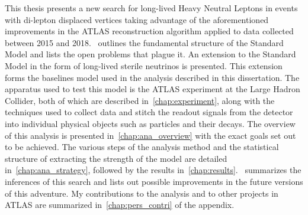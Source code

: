 This thesis presents a new search for long-lived Heavy Neutral Leptons in events with di-lepton displaced vertices taking advantage of the aforementioned improvements in the ATLAS reconstruction algorithm applied to data collected between 2015 and 2018.~ outlines the fundamental structure of the Standard Model and lists the open problems that plague it. An extension to the Standard Model in the form of long-lived sterile neutrinos is presented. This extension forms the baselines model used in the analysis described in this dissertation. The apparatus used to test this model is the ATLAS experiment at the Large Hadron Collider, both of which are described in~\cref{chap:experiment}, along with the techniques used to collect data and stitch the readout signals from the detector into individual physical objects such as particles and their decays. The overview of this analysis is presented in~\cref{chap:ana_overview} with the exact goals set out to be achieved. The various steps of the analysis method and the statistical structure of extracting the strength of the model are detailed in~\cref{chap:ana_strategy}, followed by the results in~\cref{chap:results}.~ summarizes the inferences of this search and lists out possible improvements in the future versions of this adventure. My contributions to the analysis and to other projects in ATLAS are summarized in~\cref{chap:pers_contri} of the appendix.